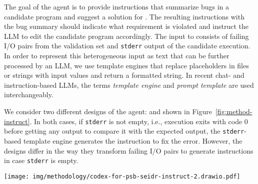 The goal of the \instruct{} agent is to provide instructions that summarize bugs in a candidate program and suggest a solution for \debugmodelnoargs{}. 
The resulting instructions with the bug summary should indicate what requirement is violated and instruct the LLM to edit the candidate program accordingly. 
The input to \instruct{} consists of failing I/O pairs from the validation set and \texttt{stderr} output of the candidate execution. 
In order to represent this heterogeneous input as text that can be further processed by an LLM, we use template engines that replace placeholders in files or strings with input values and return a formatted string. 
In recent chat- and instruction-based LLMs, the terms \emph{template engine} and \emph{prompt template} are used interchangeably.

We consider two different designs of the \instruct{} agent: \instructs{} and \instructllm{} shown in Figure~\ref{fig:method-instruct}. 
In both cases, if \texttt{stderr} is not empty, i.e., execution exits with code 0 before getting any output to compare it with the expected output, the \texttt{stderr}-based template engine generates the instruction to fix the error. 
However, the designs differ in the way they transform failing I/O pairs to generate instructions in case \texttt{stderr} is empty.

\begin{figure*}[t]
    \centering
    \texttt{[image: img/methodology/codex-for-psb-seidr-instruct-2.drawio.pdf]}
    \caption{Overview of the two designs for the \instruct{} agent.}
    \label{fig:method-instruct}
\end{figure*}

